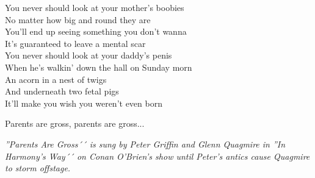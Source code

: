 \vspace{10pt}
You never should look at your mother's boobies\\
No matter how big and round they are\\
You'll end up seeing something you don't wanna\\
It's guaranteed to leave a mental scar\\
You never should look at your daddy's penis\\
When he's walkin' down the hall on Sunday morn\\
An acorn in a nest of twigs\\
And underneath two fetal pigs\\
It'll make you wish you weren't even born\par
\vspace{10pt}
Parents are gross, parents are gross...
\par
\vspace{10pt}
{\footnotesize\textit{''Parents Are Gross´´ is sung by Peter Griffin and Glenn Quagmire in ''In Harmony's Way´´ on Conan O'Brien's show until Peter's antics cause Quagmire to storm offstage.}}
